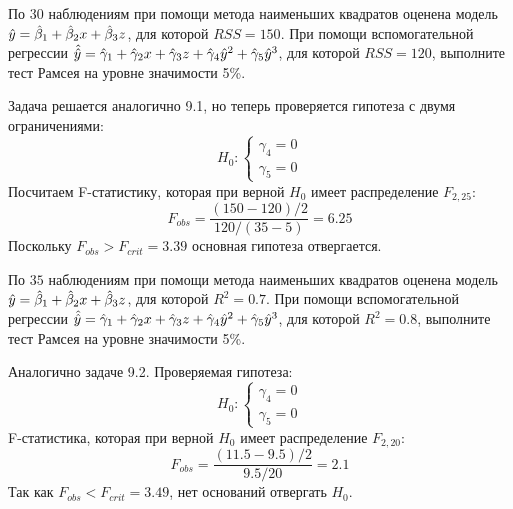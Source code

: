 \begin{problem}
По $30$ наблюдениям при помощи метода наименьших квадратов оценена
модель $\hat{y}=\hat{\beta}_1+\hat{\beta}_2 x +\hat{\beta}_3 z$, для которой $RSS = 150$. При помощи вспомогательной регрессии $\hat{\hat{y}}=\hat{\gamma}_1+\hat{\gamma}_2 x +\hat{\gamma}_3 z+\hat{\gamma}_4 \hat{y}^2+\hat{\gamma}_5 \hat{y}^3$, для которой $RSS = 120$, выполните тест Рамсея на уровне значимости 5\%.

\begin{sol}
Задача решается аналогично 9.1, но теперь проверяется гипотеза с двумя ограничениями:
\[
H_0:
\begin{cases}
\gamma_4 = 0 \\
\gamma_5 = 0
\end{cases}
\]
Посчитаем F-статистику, которая при верной $H_0$ имеет распределение $F_{2, 25}$:
\[
F_{obs} = \frac{(150-120)/2}{120/(35-5)} = 6.25
\]
Поскольку $F_{obs} > F_{crit} = 3.39$ основная гипотеза отвергается.
\end{sol}
\end{problem}


\begin{problem}
По $35$ наблюдениям при помощи метода наименьших квадратов оценена
модель $\hat{y}=\hat{\beta}_1+\hat{\beta}_2 x +\hat{\beta}_3 z$, для которой $R^2 = 0.7$. При помощи вспомогательной регрессии $\hat{\hat{y}}=\hat{\gamma}_1+\hat{\gamma}_2 x +\hat{\gamma}_3 z+\hat{\gamma}_4 \hat{y}^2+\hat{\gamma}_5 \hat{y}^3$, для которой $R^2 = 0.8$, выполните тест Рамсея на уровне значимости 5\%.


\begin{sol}
Аналогично задаче 9.2. Проверяемая гипотеза:
\[
H_0:
\begin{cases}
\gamma_4 = 0 \\
\gamma_5 = 0
\end{cases}
\]
F-статистика, которая при верной $H_0$ имеет распределение $F_{2, 20}$:
\[
F_{obs} = \frac{(11.5-9.5)/2}{9.5/20} = 2.1
\]
Так как $F_{obs} < F_{crit} = 3.49$, нет оснований отвергать $H_0$.
\end{sol}
\end{problem}


